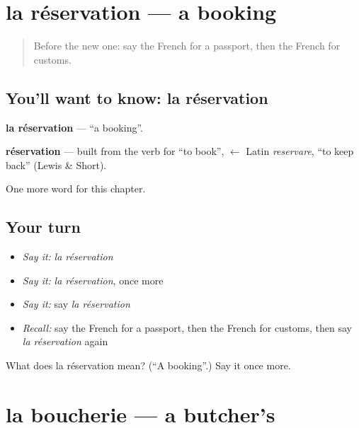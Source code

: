 \section[la réservation]{la réservation — a booking}

\label{lesson:FR-C164-reservation}



\begin{quote}
Before the new one: say the French for a passport, then the French for customs.
\end{quote}

\subsection*{You'll want to know: la réservation}
\textbf{la réservation} — \textquotedblleft{}a booking\textquotedblright{}.

\begin{cousinweb}
\textbf{réservation} — built from the verb for \textquotedblleft{}to book\textquotedblright{}, $\leftarrow$ Latin \emph{reservare}, \textquotedblleft{}to keep back\textquotedblright{} (Lewis \& Short).
\end{cousinweb}

\begin{grammarlens}[title={What you've built}]
One more word for this chapter.
\end{grammarlens}

\subsection*{Your turn}
\begin{itemize}
\raggedright
  \item \emph{Say it:} \emph{la réservation}
  \item \emph{Say it:} \emph{la réservation}, once more
  \item \emph{Say it:} say \emph{la réservation}
  \item \emph{Recall:} say the French for a passport, then the French for customs, then say \emph{la réservation} again
\end{itemize}

\begin{tcolorbox}[breakable,colback=teal!4,colframe=teal!35!black,title={Before you move on}]
What does la réservation mean? (\textquotedblleft{}A booking\textquotedblright{}.) Say it once more.
\end{tcolorbox}
\section[la boucherie]{la boucherie — a butcher's}

